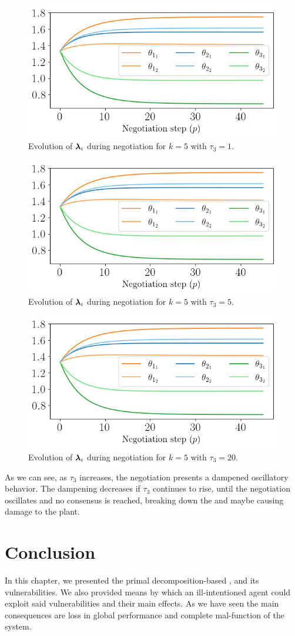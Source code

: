 \documentclass[../main.tex]{subfiles}
\begin{document}
\begin{figure}[h]
  \centering
  \includegraphics[width=.5\textwidth]{../img/example_theta.png}
  \caption{Evolution of $\boldsymbol{\lambda}_i$ during negotiation for $k=5$ with $\tau_{3}=1$. }\label{fig:example_vary_tau_lambda_tau_1}
\end{figure}
\begin{figure}[h]
  \centering
  \includegraphics[width=.5\textwidth]{../img/example_theta.png}
  \caption{Evolution of $\boldsymbol{\lambda}_i$ during negotiation for $k=5$ with $\tau_{3}=5$. }\label{fig:example_vary_tau_lambda_tau_5}
\end{figure}

\begin{figure}[h]
  \centering
  \includegraphics[width=.5\textwidth]{../img/example_theta.png}
  \caption{Evolution of $\boldsymbol{\lambda}_i$ during negotiation for $k=5$ with $\tau_{3}=20$. }\label{fig:example_vary_tau_lambda_tau_20}
\end{figure}
As we can see, as $\tau_{3}$ increases, the negotiation presents a dampened oscillatory behavior.
The dampening decreases if $\tau_{3}$ continues to rise, until the negotiation oscillates and no consensus is reached, breaking down the \dmpc{} and maybe causing damage to the plant.

\section{Conclusion}\label{sec:conclusion}
In this chapter, we presented the primal decomposition-based \dmpc{}, and its vulnerabilities.
We also provided means by which an ill-intentioned agent could exploit said vulnerabilities and their main effects.
As we have seen the main consequences are loss in global performance and complete mal-function of the system.
\end{document}
